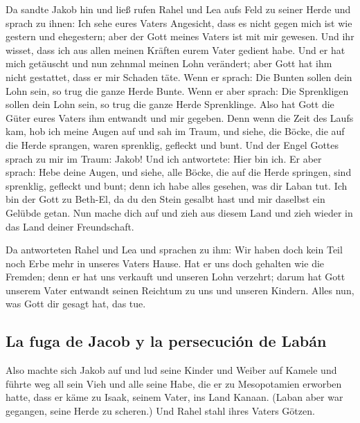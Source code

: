  Da sandte Jakob hin und ließ rufen Rahel und Lea aufs
Feld zu seiner Herde  und sprach zu ihnen: Ich sehe eures
Vaters Angesicht, dass es nicht gegen mich ist wie gestern und
ehegestern; aber der Gott meines Vaters ist mit mir gewesen.
 Und ihr wisset, dass ich aus allen meinen Kräften eurem
Vater gedient habe.  Und er hat mich getäuscht und nun
zehnmal meinen Lohn verändert; aber Gott hat ihm nicht gestattet, dass
er mir Schaden täte.  Wenn er sprach: Die Bunten sollen
dein Lohn sein, so trug die ganze Herde Bunte. Wenn er aber sprach: Die
Sprenkligen sollen dein Lohn sein, so trug die ganze Herde Sprenklinge.
 Also hat Gott die Güter eures Vaters ihm entwandt und mir
gegeben.  Denn wenn die Zeit des Laufs kam, hob ich meine
Augen auf und sah im Traum, und siehe, die Böcke, die auf die Herde
sprangen, waren sprenklig, gefleckt und bunt.  Und der
Engel Gottes sprach zu mir im Traum: Jakob! Und ich antwortete: Hier bin
ich.  Er aber sprach: Hebe deine Augen, und siehe, alle
Böcke, die auf die Herde springen, sind sprenklig, gefleckt und bunt;
denn ich habe alles gesehen, was dir Laban tut.  Ich bin
der Gott zu Beth-El, da du den Stein gesalbt hast und mir daselbst ein
Gelübde getan. Nun mache dich auf und zieh aus diesem Land und zieh
wieder in das Land deiner Freundschaft.

 Da antworteten Rahel und Lea und sprachen zu ihm: Wir
haben doch kein Teil noch Erbe mehr in unseres Vaters Hause.
 Hat er uns doch gehalten wie die Fremden; denn er hat
uns verkauft und unseren Lohn verzehrt;  darum hat Gott
unserem Vater entwandt seinen Reichtum zu uns und unseren Kindern. Alles
nun, was Gott dir gesagt hat, das tue.

\hypertarget{la-fuga-de-jacob-y-la-persecuciuxf3n-de-labuxe1n}{%
\subsection{La fuga de Jacob y la persecución de
Labán}\label{la-fuga-de-jacob-y-la-persecuciuxf3n-de-labuxe1n}}

 Also machte sich Jakob auf und lud seine Kinder und
Weiber auf Kamele  und führte weg all sein Vieh und alle
seine Habe, die er zu Mesopotamien erworben hatte, dass er käme zu
Isaak, seinem Vater, ins Land Kanaan.  (Laban aber war
gegangen, seine Herde zu scheren.) Und Rahel stahl ihres Vaters Götzen.

